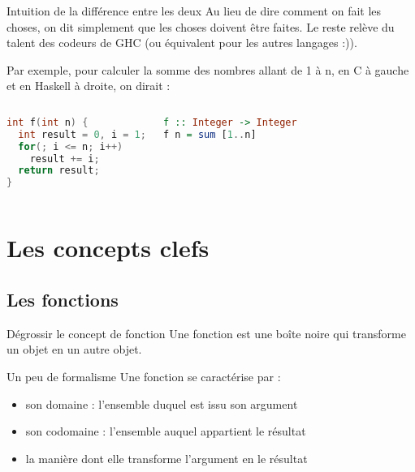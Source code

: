 \documentclass[handout]{beamer}
\begin{document}
  \begin{frame}[fragile]{Intuition de la différence entre les deux}
   Au lieu de dire comment on fait les choses, on dit simplement que les choses
   doivent être faites. Le reste relève du talent des codeurs de GHC (ou
   équivalent pour les autres langages :)).
   
   \pause
   
   Par exemple, pour calculer la somme des nombres allant de 1 à n, en C à
   gauche et en Haskell à droite, on dirait :
   \begin{columns}[t] %
     \begin{lstlisting}[language=C]
int f(int n) {
  int result = 0, i = 1;
  for(; i <= n; i++)
    result += i;
  return result;
}
     \end{lstlisting}
     \begin{lstlisting}[language=Haskell]
f :: Integer -> Integer
f n = sum [1..n]
     \end{lstlisting}
   \end{columns}
\end{frame}





 \section{Les concepts clefs}
 \subsection{Les fonctions}
  \begin{frame}{Dégrossir le concept de fonction}
   Une fonction est une boîte noire qui transforme un objet en un autre
   objet.
  \end{frame}


  \begin{frame}{Un peu de formalisme}
   Une fonction se caractérise par :
   \pause
   \begin{itemize}[<+->]
    \item son domaine : l'ensemble duquel est issu son argument
    \item son codomaine : l'ensemble auquel appartient le résultat
    \item la manière dont elle transforme l'argument en le résultat
   \end{itemize}
  \end{frame}
\end{document}
